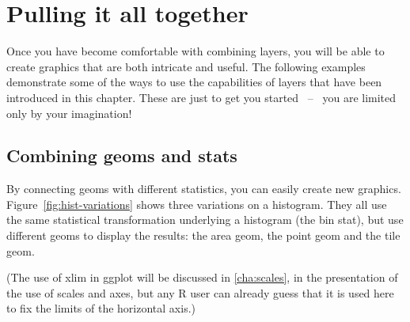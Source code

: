 \section{Pulling it all together}
\label{sec:pull-together}

Once you have become comfortable with combining layers, you will be able to create graphics that are both intricate and useful.  The following examples demonstrate some of the ways to use the capabilities of layers that have been introduced in this chapter.  These are just to get you started ~--~ you are limited only by your imagination!

\subsection{Combining geoms and stats}
\label{sub:new_plot_types}

By connecting geoms with different statistics, you can easily create new graphics.  Figure~\ref{fig:hist-variations} shows three variations on a histogram.  They all use the same statistical transformation underlying a histogram (the bin stat), but use different geoms to display the results: the area geom, the point geom and the tile geom.  

% 



(The use of xlim in ggplot will be discussed in \ref{cha:scales}, in the presentation of the use of scales and axes, but any R user can already guess that it is used here to fix the limits of the horizontal axis.)

% 


